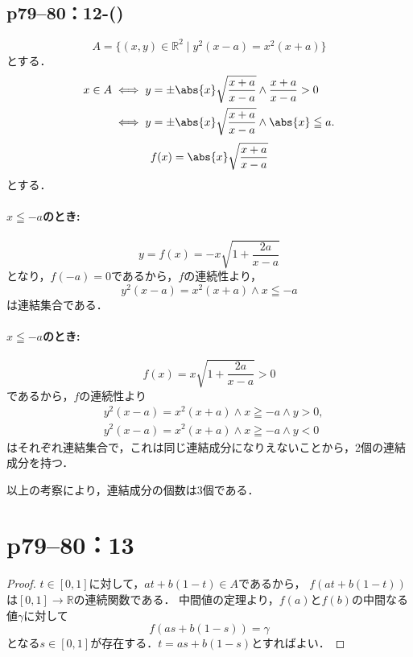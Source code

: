 \subsection*{p79--80：12-()} \label{p79--80：12-(\romannumeral4)}

\begin{leftbar}
    \[
        A = \{ (x,y) \in \mathbb{R}^2 \mid y^2(x-a)=x^2(x+a) \}
    \]
    とする．
    \begin{align*}
        x \in A & \iff y= \pm \abs{x}\sqrt{\frac{x+a}{x-a}} \land \frac{x+a}{x-a} >0 \\
                & \iff y= \pm \abs{x}\sqrt{\frac{x+a}{x-a}} \land \abs{x} \leqq a .
    \end{align*}
    \[
        f(x)=\abs{x}\sqrt{\frac{x+a}{x-a}}
    \]
    とする．

    \paragraph{$x \leqq -a$のとき:}
    \[
        y=f(x)=-x \sqrt{1+\frac{2a}{x-a}}
    \]
    となり，$f(-a)=0$であるから，$f$の連続性より，
    \[
        y^2(x-a)=x^2(x+a) \land x \leqq -a
    \]
    は連結集合である．

    \paragraph{$x \leqq -a$のとき:}
    \[
        f(x)=x \sqrt{1+\frac{2a}{x-a}} >0
    \]
    であるから，$f$の連続性より
    \begin{align*}
         & y^2(x-a)=x^2(x+a) \land x \geqq -a \land y >0 , \\
         & y^2(x-a)=x^2(x+a) \land x \geqq -a \land y <0
    \end{align*}
    はそれぞれ連結集合で，これは同じ連結成分になりえないことから，2個の連結成分を持つ．

    以上の考察により，連結成分の個数は3個である．
\end{leftbar}


\section*{p79--80：13} \label{p79--80：13}

\begin{leftbar}
    \begin{proof}
        $ t \in [0,1]$に対して，$at +b(1-t) \in A$であるから，
        $f(at +b(1-t))$は$[0,1] \longrightarrow \mathbb{R}$の連続関数である．
        中間値の定理より，$f(a)$と$f(b)$の中間なる値$\gamma$に対して
        \[
            f(as +b(1-s)) = \gamma
        \]
        となる$s \in [0,1]$が存在する．$t=as+b(1-s)$とすればよい．
    \end{proof}
\end{leftbar}

